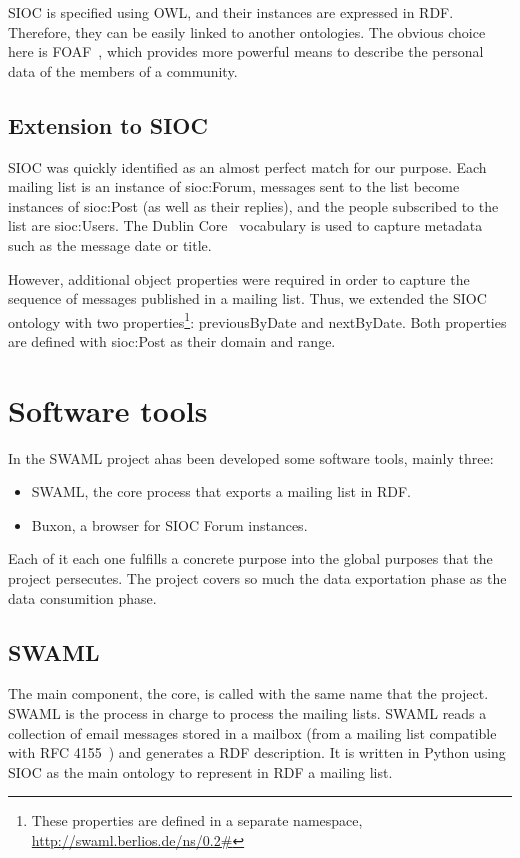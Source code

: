 \documentclass{llncs}
\begin{document}
SIOC is specified using OWL, and their instances are expressed
in RDF. Therefore, they can be easily linked to another ontologies.
The obvious choice here is FOAF~\cite{FOAF}, which provides more
powerful means to describe the personal data of the members of
a community.

\subsection{Extension to SIOC}

SIOC was quickly identified as an almost perfect match for our
purpose. Each mailing list is an instance of \textsf{sioc:Forum},
messages sent to the list become instances of \textsf{sioc:Post}
(as well as their replies), and the people subscribed to the
list are \textsf{sioc:User}s. The Dublin Core~\cite{DublinCore}
vocabulary is used to capture metadata such as the message
date or title.

However, additional object properties were required
in order to capture the sequence of messages published in a
mailing list. Thus, we extended the SIOC ontology with two
properties\footnote{These properties are defined in a separate
namespace, \url{http://swaml.berlios.de/ns/0.2\#}}:
\textsf{previousByDate} and \textsf{nextByDate}. Both properties
are defined with \textsf{sioc:Post} as their domain and range.

\section{\label{sec:tools}Software tools}

In the SWAML project ahas been developed some software tools, mainly 
three:

\begin{itemize}
 \item SWAML, the core process that exports a mailing list in RDF.
 \item Buxon, a browser for SIOC Forum instances.
\end{itemize}

Each of it each one fulfills a concrete purpose into the global purposes 
that the project persecutes. The project covers so much the data exportation 
phase as the data consumition phase.

\subsection{SWAML}

The main component, the core, is called with the same name that the project. 
SWAML is the process in charge to process the mailing lists. SWAML reads a 
collection of email messages stored in a mailbox (from a mailing list 
compatible with RFC 4155~\cite{RFC4155}) and generates a RDF description. It is written in 
Python using SIOC as the main ontology to represent in RDF a mailing list.
\end{document}
